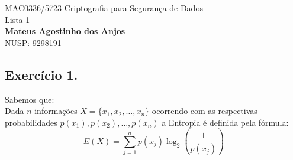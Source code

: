 \documentclass[12pt]{article}
\begin{document}
\begin{center}
{\Large MAC0336/5723 Criptografia para Segurança de Dados\\
Lista 1}\\
\textbf{Mateus Agostinho dos Anjos}\\
NUSP: 9298191
\end{center}

\vspace{0.2 cm}

\subsection*{Exercício 1.}
	Sabemos que:\\
	Dada $n$ informações $X = \{ x_1, x_2, \dots, x_n\}$ ocorrendo com as respectivas probabilidades
	$p(x_1), p(x_2), \dots, p(x_n)$  a Entropia é definida pela fórmula:\\
	\[E(X) = \sum_{j = 1} ^ {n} p(x_j)\log_2(\frac{1}{p(x_j)})\]
\end{document}
